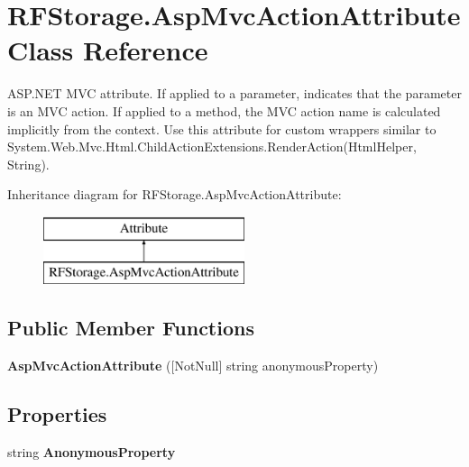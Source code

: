 \section{R\+F\+Storage.\+Asp\+Mvc\+Action\+Attribute Class Reference}
\label{class_r_f_storage_1_1_asp_mvc_action_attribute}


A\+S\+P.\+N\+ET M\+VC attribute. If applied to a parameter, indicates that the parameter is an M\+VC action. If applied to a method, the M\+VC action name is calculated implicitly from the context. Use this attribute for custom wrappers similar to {\ttfamily System.\+Web.\+Mvc.\+Html.\+Child\+Action\+Extensions.\+Render\+Action(\+Html\+Helper, String)}.  


Inheritance diagram for R\+F\+Storage.\+Asp\+Mvc\+Action\+Attribute\+:\begin{figure}[H]
\begin{center}
\leavevmode
\includegraphics[height=2.000000cm]{class_r_f_storage_1_1_asp_mvc_action_attribute}
\end{center}
\end{figure}
\subsection*{Public Member Functions}
\begin{DoxyCompactItemize}
\item 
\mbox{\label{class_r_f_storage_1_1_asp_mvc_action_attribute_af179ac7728f9ff9ae77906d75fc04ce1}} 
{\bfseries Asp\+Mvc\+Action\+Attribute} ([Not\+Null] string anonymous\+Property)
\end{DoxyCompactItemize}
\subsection*{Properties}
\begin{DoxyCompactItemize}
\item 
\mbox{\label{class_r_f_storage_1_1_asp_mvc_action_attribute_a490eb3c26695fa88f66c7b9f1fe3f038}} 
string {\bfseries Anonymous\+Property}\hspace{0.3cm}{\ttfamily  [get]}
\end{DoxyCompactItemize}



